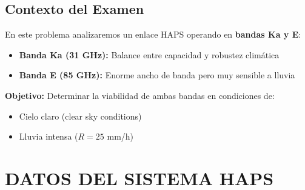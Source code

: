 \documentclass[a4paper,10pt]{article}
\begin{document}
\subsection{Contexto del Examen}

En este problema analizaremos un enlace HAPS operando en \textbf{bandas Ka y E}:
\begin{itemize}
    \item \textbf{Banda Ka (31 GHz):} Balance entre capacidad y robustez climática
    \item \textbf{Banda E (85 GHz):} Enorme ancho de banda pero muy sensible a lluvia
\end{itemize}

\textbf{Objetivo:} Determinar la viabilidad de ambas bandas en condiciones de:
\begin{itemize}
    \item Cielo claro (clear sky conditions)
    \item Lluvia intensa ($R = 25$ mm/h)
\end{itemize}

\section{DATOS DEL SISTEMA HAPS}
\end{document}
